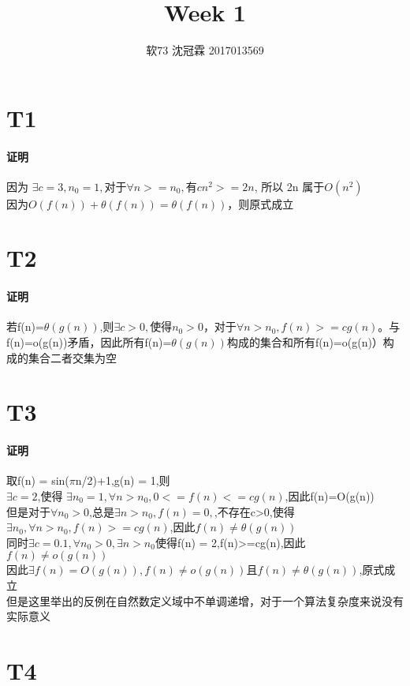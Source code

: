 \documentclass{article}
\title{Week 1}
\author{软73 沈冠霖 2017013569}
\begin{document}
\begin{CJK}{UTF8}{gkai}
\maketitle
\section{T1} 
\paragraph{证明}
因为 $\exists c = 3,n_{0} = 1,$对于$\forall n >= n_{0},$有$cn^{2}>=2n$, 所以 2n 属于$ O(n^{2}) $ \\
因为$O(f(n))+\theta(f(n)) = \theta(f(n))$，则原式成立
\section{T2} 
\paragraph{证明}
若f(n)=$\theta(g(n))$,则$\exists c>0,$使得$n_{0}>0$，对于$\forall n>n_{0},f(n)>=cg(n)$。与f(n)=o(g(n))矛盾，因此所有f(n)=$\theta(g(n))$构成的集合和所有f(n)=o(g(n)）构成的集合二者交集为空
\section{T3} 
\paragraph{证明}
取f(n) = sin($\pi$n/2)+1,g(n) = 1,则\\
$\exists c=2$,使得 $\exists n_{0} = 1,\forall n > n_{0},0<=f(n)<=cg(n)$,因此f(n)=O(g(n))\\
但是对于$\forall n_{0}>0$,总是$\exists n>n_{0},f(n) = 0,$,不存在c>0,使得$\exists n_{0},\forall n > n_{0},f(n)>=cg(n)$,因此$f(n) \neq \theta(g(n))$\\
同时$\exists c=0.1, \forall n_{0} > 0,\exists n > n_{0}$使得f(n) = 2,f(n)>=cg(n),因此 $f(n) \neq o(g(n))$\\
因此$\exists f(n)=O(g(n)), f(n) \neq o(g(n))$且$f(n) \neq \theta(g(n))$,原式成立\\
但是这里举出的反例在自然数定义域中不单调递增，对于一个算法复杂度来说没有实际意义\\
\section{T4} 

\end{CJK}
\end{document}
